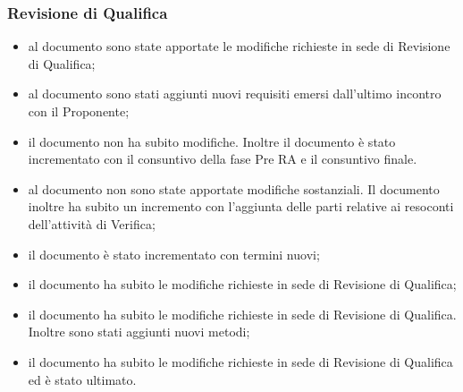 \subsubsection{Revisione di Qualifica}
\begin{itemize}
\item {} al documento sono state apportate le modifiche richieste in sede di Revisione di Qualifica;
\item {} al documento sono stati aggiunti nuovi requisiti emersi dall'ultimo incontro con il Proponente;
\item {} il documento non ha subito modifiche. Inoltre il documento è stato incrementato con il consuntivo della fase Pre RA e il consuntivo finale.
\item {} al documento non sono state apportate modifiche sostanziali.
Il documento inoltre ha subito un incremento con l'aggiunta delle parti relative ai resoconti dell'attività di Verifica;
\item {} il documento è stato incrementato con termini nuovi;
\item {} il documento ha subito le modifiche richieste in sede di Revisione di Qualifica;
\item {} il documento ha subito le modifiche richieste in sede di Revisione di Qualifica. Inoltre sono stati aggiunti nuovi metodi;
\item {} il documento ha subito le modifiche richieste in sede di Revisione di Qualifica ed è stato ultimato.
\end{itemize}



